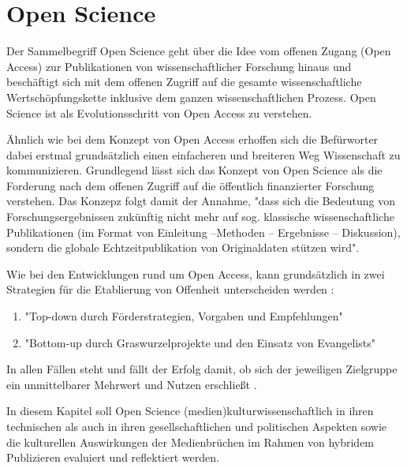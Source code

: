 \section{Open Science}
Der Sammelbegriff Open Science geht über die Idee vom offenen Zugang (Open Access) zur Publikationen von wissenschaftlicher Forschung hinaus und beschäftigt sich mit dem offenen Zugriff auf die gesamte wissenschaftliche Wertschöpfungskette inklusive dem ganzen wissenschaftlichen Prozess. Open Science ist als Evolutionsschritt von Open Access zu verstehen. 

Ähnlich wie bei dem Konzept von Open Access erhoffen sich die Befürworter dabei erstmal grundsätzlich einen einfacheren und breiteren Weg Wissenschaft zu kommunizieren. Grundlegend lässt sich das Konzept von Open Science als die Forderung nach dem offenen Zugriff auf die öffentlich finanzierter Forschung verstehen. Das Konzepz folgt damit der Annahme, "dass sich die Bedeutung von Forschungsergebnissen zukünftig nicht mehr auf sog. klassische wissenschaftliche Publikationen (im Format von Einleitung –Methoden – Ergebnisse – Diskussion), sondern die globale Echtzeitpublikation von Originaldaten stützen wird"\cite{Stengel_2013}.

Wie bei den Entwicklungen rund um Open Access, kann grundsätzlich in zwei Strategien für die Etablierung von Offenheit unterscheiden werden \cite{schulze_2013_open}: 
\begin{enumerate}
\item "Top-down durch Förderstrategien, Vorgaben und Empfehlungen"
\item "Bottom-up durch Graswurzelprojekte und den Einsatz von Evangelists"
\end{enumerate} In allen Fällen steht und fällt der Erfolg damit, ob sich der jeweiligen Zielgruppe ein unmittelbarer Mehrwert und Nutzen erschließt \cite{schulze_2013_open}.


In diesem Kapitel soll Open Science (medien)kulturwissenschaftlich in ihren technischen als auch in ihren gesellschaftlichen und politischen Aspekten sowie die kulturellen Auswirkungen der Medienbrüchen im Rahmen von hybridem Publizieren evaluiert und reflektiert werden.
